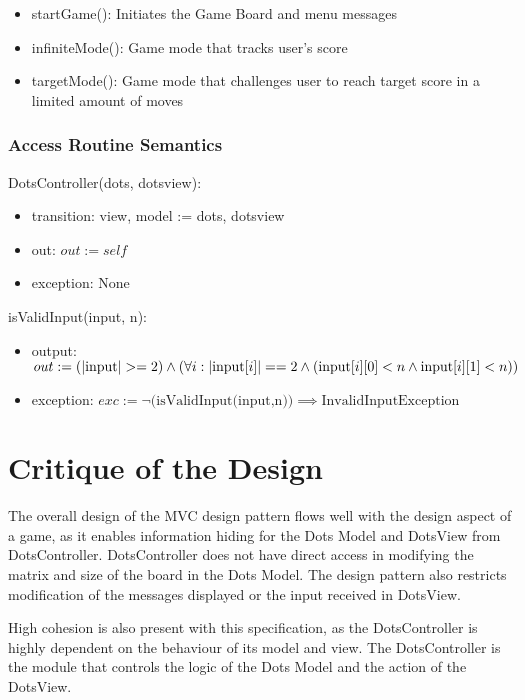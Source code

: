 \documentclass[12pt]{article}
\begin{document}
\begin{itemize}
\item startGame(): Initiates the Game Board and menu messages
\item infiniteMode(): Game mode that tracks user's score 
\item targetMode(): Game mode that challenges user to reach target score in a limited amount of moves
\end{itemize}

\subsubsection* {Access Routine Semantics}

\noindent DotsController(dots, dotsview):
\begin{itemize}
\item transition: view, model := dots, dotsview 
\item out: $out := self$
\item exception: None
\end{itemize}

\noindent isValidInput(input, n):
\begin{itemize}
\item output: $out := (|\mbox{input}| >= 2) \land (\forall i: |\mbox{input}[i]| == 2 \land (\mbox{input}[i][0] < n \land \\ \mbox{input}[i][1] < n))$
\item exception: $exc := \lnot \mbox{(isValidInput(input,n))} \implies \mbox{InvalidInputException}$
\end{itemize}

\newpage

\section*{Critique of the Design}
The overall design of the MVC design pattern flows well with the design aspect of a game, as it enables information hiding for the Dots Model and DotsView from DotsController. DotsController does not have direct access in modifying the matrix and size of the board in the Dots Model. The design pattern also restricts modification of the messages displayed or the input received in DotsView. 

High cohesion is also present with this specification, as the DotsController is highly dependent on the behaviour of its model and view. The DotsController is the module that controls the logic of the Dots Model and the action of the DotsView. 
\end{document}
